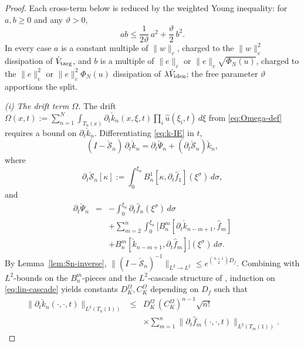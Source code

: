 \documentclass[journal,twoside,web]{ieeecolor}
\begin{document}
\begin{proof}
Each cross-term below is reduced by the weighted Young inequality: for $a,b\ge 0$ and any $\vartheta>0$,
\begin{equation}\label{eq:young}
ab\le\frac{1}{2\vartheta}\,a^2+\frac{\vartheta}{2}\,b^2.
\end{equation}
In every case $a$ is a constant multiple of $\|w\|_c$, charged to the $\|w\|_c^2$ dissipation of $\dot V_{\rm targ}$, and $b$ is a multiple of $\|e\|_c$ or $\|e\|_c\sqrt{\Phi_N(u)}$, charged to the $\|e\|_c^2$ or $\|e\|_c^2\Phi_N(u)$ dissipation of $\lambda\dot V_{\rm iden}$; the free parameter $\vartheta$ apportions the split.

\emph{(i) The drift term $\Omega$.} The drift $\Omega(x,t):=\sum_{n=1}^N\int_{T_n(x)}\partial_t\check k_n(x,\xi,t)\prod_i\hat u(\xi_i,t)\,d\xi$ from \eqref{eq:Omega-def} requires a bound on $\partial_t\check k_n$. Differentiating \eqref{eq:k-IE} in $t$,
\begin{equation}\label{eq:lin-cascade}
(I-\check{\mathcal S}_n)\,\partial_t\check k_n=\partial_t\check\Psi_n+(\partial_t\check{\mathcal S}_n)\check k_n,
\end{equation}
where
\begin{equation}\label{eq:dt-S-def}
\partial_t\check{\mathcal S}_n[\kappa]:=\int_0^{\xi_n}B^1_n[\kappa,\partial_t\hat f_1](\xi^\sigma)\,d\sigma,
\end{equation}
and
\begin{eqnarray}
\partial_t\check\Psi_n &=& -\int_0^{\xi_n}\!\partial_t\hat f_n(\xi^\sigma)\,d\sigma \nonumber\\
&& +\sum_{m=2}^n\int_0^{\xi_n}\bigl[B^m_n[\partial_t\check k_{n-m+1},\hat f_m] \nonumber\\
&& +B^m_n[\check k_{n-m+1},\partial_t\hat f_m]\bigr](\xi^\sigma)\,d\sigma. \label{eq:Psidot}
\end{eqnarray}
By Lemma~\ref{lem:Sn-inverse}, $\|(I-\check{\mathcal S}_n)^{-1}\|_{L^2\to L^2}\le e^{\binom{n+1}{2}D_f}$. Combining with $L^2$-bounds on the $B^m_n$-pieces and the $L^2$-cascade structure of \cite{HV1}, induction on \eqref{eq:lin-cascade} yields constants $D_K^\Omega,C_K^\Omega$ depending on $D_f$ such that
\begin{eqnarray}
\|\partial_t\check k_n(\cdot,\cdot,t)\|_{L^2(T_n(1))} &\le& D_K^\Omega\,(C_K^\Omega)^{n-1}\sqrt{n!} \nonumber\\
&& \times\sum_{m=1}^n\|\partial_t\hat f_m(\cdot,\cdot,t)\|_{L^2(T_m(1))}. \label{eq:partialt-k-L2}
\end{eqnarray}

\end{proof}
\end{document}
